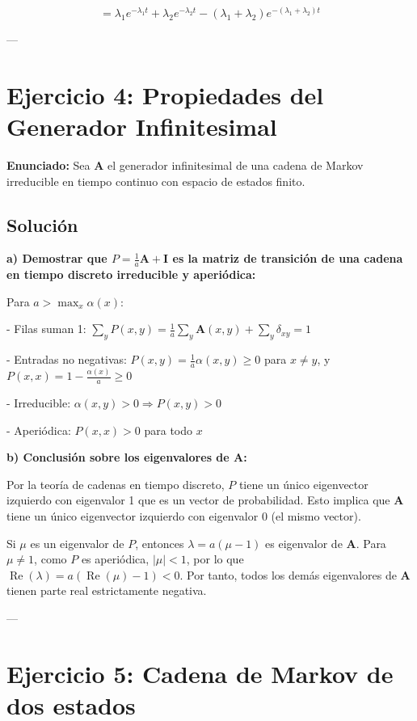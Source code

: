 \documentclass{article}
\theoremstyle{definition}
\newcommand{\A}{\mathbf{A}}
\newcommand{\I}{\mathbf{I}}
\begin{document}
\[
= \lambda_1 e^{-\lambda_1 t} + \lambda_2 e^{-\lambda_2 t} - (\lambda_1+\lambda_2)e^{-(\lambda_1+\lambda_2)t}
\]

---

\section*{Ejercicio 4: Propiedades del Generador Infinitesimal}

\textbf{Enunciado:} Sea $\A$ el generador infinitesimal de una cadena de Markov irreducible en tiempo continuo con espacio de estados finito.

\subsection*{Solución}

\textbf{a) Demostrar que $P = \frac{1}{a}\A + \I$ es la matriz de transición de una cadena en tiempo discreto irreducible y aperiódica:}

Para $a > \max_x \alpha(x)$:

- Filas suman 1: $\sum_y P(x,y) = \frac{1}{a}\sum_y \A(x,y) + \sum_y \delta_{xy} = 1$

- Entradas no negativas: $P(x,y) = \frac{1}{a}\alpha(x,y) \geq 0$ para $x \neq y$, y $P(x,x) = 1 - \frac{\alpha(x)}{a} \geq 0$

- Irreducible: $\alpha(x,y) > 0 \Rightarrow P(x,y) > 0$

- Aperiódica: $P(x,x) > 0$ para todo $x$

\textbf{b) Conclusión sobre los eigenvalores de $\A$:}

Por la teoría de cadenas en tiempo discreto, $P$ tiene un único eigenvector izquierdo con eigenvalor 1 que es un vector de probabilidad. Esto implica que $\A$ tiene un único eigenvector izquierdo con eigenvalor 0 (el mismo vector).

Si $\mu$ es un eigenvalor de $P$, entonces $\lambda = a(\mu - 1)$ es eigenvalor de $\A$. Para $\mu \neq 1$, como $P$ es aperiódica, $|\mu| < 1$, por lo que $\operatorname{Re}(\lambda) = a(\operatorname{Re}(\mu) - 1) < 0$. Por tanto, todos los demás eigenvalores de $\A$ tienen parte real estrictamente negativa.

---

\section*{Ejercicio 5: Cadena de Markov de dos estados}
\end{document}
